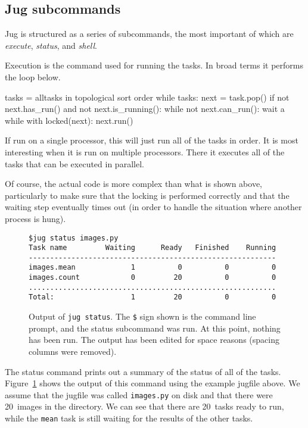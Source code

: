 \documentclass{article}
\let\code\texttt
\begin{document}
\subsection{Jug subcommands}

Jug is structured as a series of subcommands, the most important of which are
\emph{execute}, \emph{status}, and \emph{shell}.

Execution is the command used for running the tasks. In broad terms it performs
the loop below.

\begin{python}
tasks = alltasks in topological sort order
while tasks:
    next = task.pop()
    if not next.has_run() and not next.is_running():
        while not next.can_run():
            wait a while
        with locked(next):
            next.run()
\end{python}

If run on a single processor, this will just run all of the tasks in order. It
is most interesting when it is run on multiple processors. There it executes
all of the tasks that can be executed in parallel.

Of course, the actual code is more complex than what is shown above,
particularly to make sure that the locking is performed correctly and that the
waiting step eventually times out (in order to handle the situation where
another process is hung).

\begin{figure}
\begin{verbatim}
$jug status images.py
Task name         Waiting      Ready   Finished    Running
----------------------------------------------------------
images.mean             1          0          0          0
images.count            0         20          0          0
..........................................................
Total:                  1         20          0          0
\end{verbatim}
\caption{Output of \code{jug status}. The \texttt{\$} sign shown is the command
line prompt, and the status subcommand was run. At this point, nothing has been
run. The output has been edited for space reasons (spacing columns were
removed).}
\label{fig:jug-status-output}
\end{figure}

The status command prints out a summary of the status of all of the tasks.
Figure~\ref{fig:jug-status-output} shows the output of this command using the
example jugfile above. We assume that the jugfile was called \code{images.py}
on disk and that there were 20~images in the directory. We can see that there
are 20~tasks ready to run, while the \code{mean} task is still waiting for the
results of the other tasks.
\end{document}
